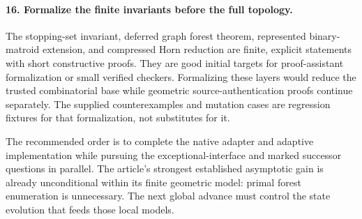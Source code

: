 \paragraph{16. Formalize the finite invariants before the full topology.}
The stopping-set invariant, deferred graph forest theorem, represented
binary-matroid extension, and compressed Horn reduction are finite,
explicit statements with short constructive proofs.  They are good
initial targets for proof-assistant formalization or small verified
checkers.  Formalizing these layers would reduce the trusted combinatorial
base while geometric source-authentication proofs continue separately.
The supplied counterexamples and mutation cases are regression fixtures
for that formalization, not substitutes for it.

The recommended order is to complete the native adapter and adaptive
implementation while pursuing the exceptional-interface and marked
successor questions in parallel.  The article's strongest established
asymptotic gain is already unconditional within its finite geometric
model: primal forest enumeration is unnecessary.  The next global
advance must control the state evolution that feeds those local models.
